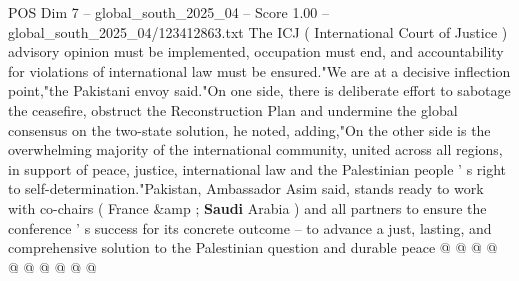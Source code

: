 \begin{textsample}{POS Dim 7 – global\_south\_2025\_04 – Score 1.00 – global\_south\_2025\_04/123412863.txt}
The ICJ ( International Court of Justice ) advisory opinion must be implemented, occupation must end, and accountability for violations of international law must be ensured."We are at a decisive inflection point,"the Pakistani envoy said."On one side, there is deliberate effort to sabotage the ceasefire, obstruct the Reconstruction Plan and undermine the global consensus on the two-state solution, he noted, adding,"On the other side is the overwhelming majority of the international community, united across all regions, in support of peace, justice, international law and the Palestinian people ' s right to self-determination."Pakistan, Ambassador Asim said, stands ready to work with co-chairs ( France \&amp ; \textbf{Saudi} Arabia ) and all partners to ensure the conference ' s success for its concrete outcome -- to advance a just, lasting, and comprehensive solution to the Palestinian question and durable peace @ @ @ @ @ @ @ @ @ @

\end{textsample}
